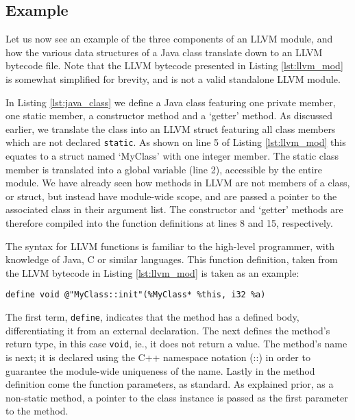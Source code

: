 \subsection*{Example}

Let us now see an example of the three components of an LLVM module, and how the various data structures of a Java class translate down to an LLVM bytecode file. Note that the LLVM bytecode presented in Listing \ref{lst:llvm_mod} is somewhat simplified for brevity, and is not a valid standalone LLVM module.

In Listing \ref{lst:java_class} we define a Java class featuring one private member, one static member, a constructor method and a `getter' method. As discussed earlier, we translate the class into an LLVM struct featuring all class members which are not declared \verb|static|. As shown on line 5 of Listing \ref{lst:llvm_mod} this equates to a struct named `MyClass' with one integer member. The static class member is translated into a global variable (line 2), accessible by the entire module. We have already seen how methods in LLVM are not members of a class, or struct, but instead have module-wide scope, and are passed a pointer to the associated class in their argument list. The constructor and `getter' methods are therefore compiled into the function definitions at lines 8 and 15, respectively.

The syntax for LLVM functions is familiar to the high-level programmer, with knowledge of Java, C or similar languages. This function definition, taken from the LLVM bytecode in Listing \ref{lst:llvm_mod} is taken as an example:

\begin{lstlisting}[frame=single]
define void @"MyClass::init"(%MyClass* %this, i32 %a)
\end{lstlisting}

The first term, \verb|define|, indicates that the method has a defined body, differentiating it from an external declaration. The next defines the method's return type, in this case \verb|void|, ie., it does not return a value. The method's name is next; it is declared using the C++ namespace notation (::) in order to guarantee the module-wide uniqueness of the name. Lastly in the method definition come the function parameters, as standard. As explained prior, as a non-static method, a pointer to the class instance is passed as the first parameter to the method.

\lstset{
	language=Java,
	basicstyle=\small,
	stringstyle=\ttfamily
}

